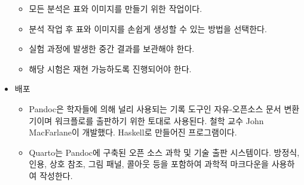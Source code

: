 \documentclass{article}
\begin{document}
\begin{itemize}
\begin{itemize}
        \item 모든 분석은 표와 이미지를 만들기 위한 작업이다.
        \item 분석 작업 후 표와 이미지를 손쉽게 생성할 수 있는 방법을 선택한다.
        \item 실험 과정에 발생한 중간 결과를 보관해야 한다.
        \item 해당 시험은 재현 가능하도록 진행되어야 한다.
    \end{itemize}
    \item 배포
        \begin{itemize}
        \item Pandoc은 학자들에 의해 널리 사용되는 기록 도구인 자유-오픈소스 문서 변환기이며 워크플로를 출판하기 위한 토대로 사용된다. 철학 교수 John MacFarlane이 개발했다. Haskell로 만들어진 프로그램이다.
        \item Quarto는 Pandoc에 구축된 오픈 소스 과학 및 기술 출판 시스템이다. 방정식, 인용, 상호 참조, 그림 패널, 콜아웃 등을 포함하여 과학적 마크다운을 사용하여 작성한다.
    \end{itemize}
\end{itemize}
\end{document}
